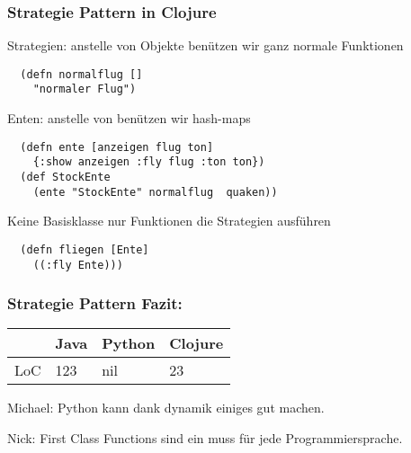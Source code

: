 \documentclass[compress, blue]{beamer}
\begin{document}

\begin{frame}[fragile]\frametitle{Strategie Pattern in Clojure}
  
Strategien: anstelle von Objekte benützen wir ganz normale Funktionen
\begin{lstlisting}
  (defn normalflug []
    "normaler Flug")
\end{lstlisting} 
\pause
Enten: anstelle von benützen wir hash-maps
\begin{lstlisting}
  (defn ente [anzeigen flug ton]
    {:show anzeigen :fly flug :ton ton})
  (def StockEnte 
    (ente "StockEnte" normalflug  quaken))
\end{lstlisting}
\pause
Keine Basisklasse nur Funktionen die Strategien ausführen 
\begin{lstlisting}
  (defn fliegen [Ente]
    ((:fly Ente)))
\end{lstlisting} 
\pause
\end{frame}





\begin{frame}\frametitle{Strategie Pattern Fazit:}
  \begin{tabular}{l | l l l}
     & Java &  Python & Clojure  \\
     \hline
    LoC & 123 &  nil & 23  \\
  \end{tabular}
  \vspace{.5cm}

  \begin{block}{Michael:}
    Python kann dank dynamik einiges gut machen.
  \end{block}

  \begin{block}{Nick: }
    First Class Functions sind ein muss für jede Programmiersprache.
  \end{block}

\end{frame}


\end{document}
